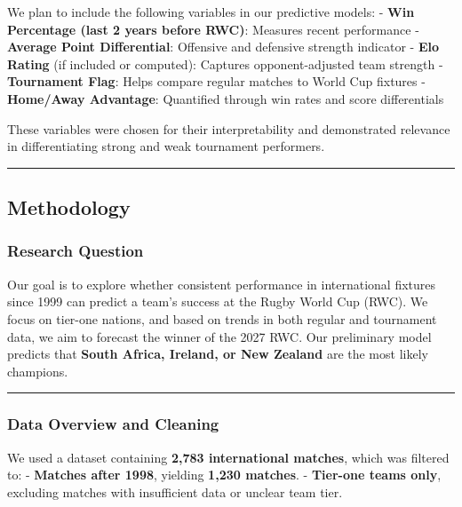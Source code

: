 \documentclass[
  letterpaper,
  DIV=11,
  numbers=noendperiod]{scrartcl}
\begin{document}
We plan to include the following variables in our predictive models: -
\textbf{Win Percentage (last 2 years before RWC)}: Measures recent
performance - \textbf{Average Point Differential}: Offensive and
defensive strength indicator - \textbf{Elo Rating} (if included or
computed): Captures opponent-adjusted team strength - \textbf{Tournament
Flag}: Helps compare regular matches to World Cup fixtures -
\textbf{Home/Away Advantage}: Quantified through win rates and score
differentials

These variables were chosen for their interpretability and demonstrated
relevance in differentiating strong and weak tournament performers.

\begin{center}\rule{0.5\linewidth}{0.5pt}\end{center}

\subsection{\texorpdfstring{\textbf{Methodology}}{Methodology}}\label{methodology}

\subsubsection{\texorpdfstring{\textbf{Research
Question}}{Research Question}}\label{research-question}

Our goal is to explore whether consistent performance in international
fixtures since 1999 can predict a team's success at the Rugby World Cup
(RWC). We focus on tier-one nations, and based on trends in both regular
and tournament data, we aim to forecast the winner of the 2027 RWC. Our
preliminary model predicts that \textbf{South Africa, Ireland, or New
Zealand} are the most likely champions.

\begin{center}\rule{0.5\linewidth}{0.5pt}\end{center}

\subsubsection{\texorpdfstring{\textbf{Data Overview and
Cleaning}}{Data Overview and Cleaning}}\label{data-overview-and-cleaning}

We used a dataset containing \textbf{2,783 international matches}, which
was filtered to: - \textbf{Matches after 1998}, yielding \textbf{1,230
matches}. - \textbf{Tier-one teams only}, excluding matches with
insufficient data or unclear team tier.
\end{document}
